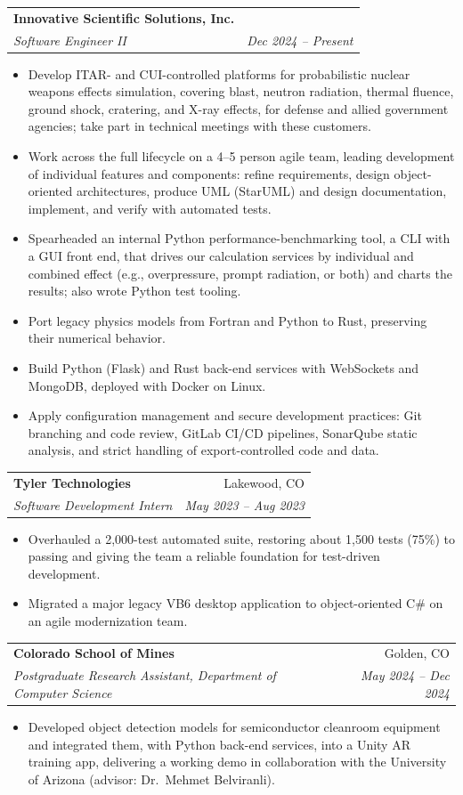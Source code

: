 \documentclass[letterpaper,10pt]{article}
\makeatletter
\newcommand{\entry}[4]{%
  \begin{tabularx}{\linewidth}{@{}X r@{}}
    \textbf{#1} & #2 \\
    \textit{#3} & \textit{\small #4} \\
  \end{tabularx}\vspace{-2pt}%
}
\makeatother
\begin{document}
\entry{Innovative Scientific Solutions, Inc.}{}{Software Engineer II}{Dec 2024 -- Present}
\begin{itemize}
  \item Develop ITAR- and CUI-controlled platforms for probabilistic nuclear weapons effects simulation, covering
        blast, neutron radiation, thermal fluence, ground shock, cratering, and X-ray effects, for defense and
        allied government agencies; take part in technical meetings with these customers.
  \item Work across the full lifecycle on a 4--5 person agile team, leading development of individual features and
        components: refine requirements, design object-oriented architectures, produce UML (StarUML) and design
        documentation, implement, and verify with automated tests.
  \item Spearheaded an internal Python performance-benchmarking tool, a CLI with a GUI front end, that drives our
        calculation services by individual and combined effect (e.g., overpressure, prompt radiation, or both) and
        charts the results; also wrote Python test tooling.
  \item Port legacy physics models from Fortran and Python to Rust, preserving their numerical behavior.
  \item Build Python (Flask) and Rust back-end services with WebSockets and MongoDB, deployed with Docker on Linux.
  \item Apply configuration management and secure development practices: Git branching and code review,
        GitLab CI/CD pipelines, SonarQube static analysis, and strict handling of export-controlled code and data.
\end{itemize}

\entry{Tyler Technologies}{Lakewood, CO}{Software Development Intern}{May 2023 -- Aug 2023}
\begin{itemize}
  \item Overhauled a 2,000-test automated suite, restoring about 1,500 tests (75\%) to passing and giving the
        team a reliable foundation for test-driven development.
  \item Migrated a major legacy VB6 desktop application to object-oriented C\# on an agile modernization team.
\end{itemize}

\entry{Colorado School of Mines}{Golden, CO}{Postgraduate Research Assistant, Department of Computer Science}{May 2024 -- Dec 2024}
\begin{itemize}
  \item Developed object detection models for semiconductor cleanroom equipment and integrated them, with Python
        back-end services, into a Unity AR training app, delivering a working demo in collaboration with the
        University of Arizona (advisor: Dr.\ Mehmet Belviranli).
\end{itemize}
\end{document}
